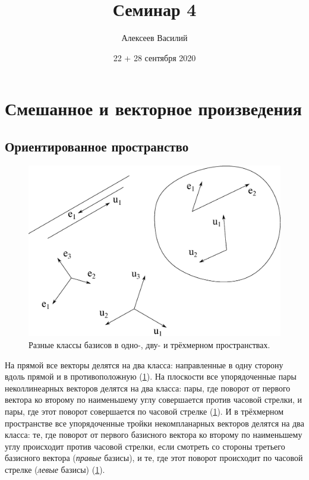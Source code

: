 \documentclass[a4paper,12pt]{article}
\author{Алексеев Василий}
\title{Семинар 4}
\date{22 + 28 сентября 2020}
\begin{document}
  \maketitle
  
  \tableofcontents

  \thispagestyle{empty}
  
  \newpage
  


  \section{Смешанное и векторное произведения}
  
  \subsection{Ориентированное пространство}
  
  \begin{figure}[h]
    \centering
    
    \includegraphics[width=0.8\columnwidth]{two-classes}
    
    \caption{Разные классы базисов в одно-, дву- и трёхмерном пространствах.}
    \label{fig:two-classes}
  \end{figure}
  
  На прямой все векторы делятся на два класса: направленные в одну сторону вдоль прямой и в противоположную (\ref{fig:two-classes}).
  На плоскости все упорядоченные пары неколлинеарных векторов делятся на два класса: пары, где поворот от первого вектора ко второму по наименьшему углу совершается против часовой стрелки, и пары, где этот поворот совершается по часовой стрелке (\ref{fig:two-classes}).
  И в трёхмерном пространстве все упорядоченные тройки некомпланарных векторов делятся на два класса: те, где поворот от первого базисного вектора ко второму по наименьшему углу происходит против часовой стрелки, если смотреть со стороны третьего базисного вектора (\emph{правые} базисы), и те, где этот поворот происходит по часовой стрелке (\emph{левые} базисы) (\ref{fig:two-classes}).
  
\end{document}
